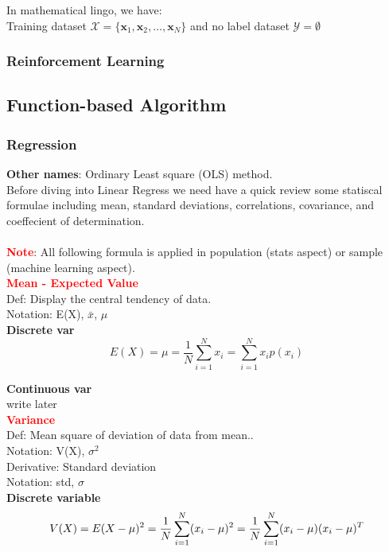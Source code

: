 \documentclass[12pt,a4paper]{article}
\newcounter{subsubsubsection}[subsubsection]
\newcommand{\red}[1]{\textcolor{red}{\textbf{#1}}}
\newcommand{\subscript}[1]{_{{#1}}}
\begin{document}
\noindent In mathematical lingo, we have:\\
Training dataset $\mathcal{X} = \{\mathbf{x}_1, \mathbf{x}_2, \dots, \mathbf{x}_N\}$ and no label dataset $\mathcal{Y} = \emptyset$

\subsubsection{Reinforcement Learning} %

\subsection{Function-based Algorithm}
\subsubsection{Regression}
\noindent \textbf{Other names}: Ordinary Least square (OLS) method.\\
Before diving into Linear Regress we need have a quick review some statiscal formulae including mean, standard deviations, correlations, covariance, and coeffecient of determination.\\\\
\red{Note}: All following formula is applied in population (stats aspect) or sample (machine learning aspect).\\

\noindent\textbf{\red{Mean -  Expected Value}}\\
Def: Display the central tendency of data.\\
Notation: E(X), $\bar{x}$, $\mu$\\
\textbf{Discrete var}
\begin{displaymath}
E(X) = \mu =
\frac{1}{N}\sum_{i=1}^{N} x\subscript{i} =
\sum_{i=1}^{N} x\subscript{i}p(x\subscript{i})
\end{displaymath}

\noindent \textbf{Continuous var}\\
write later\\

\noindent\textbf{\red{Variance}}\\
Def: Mean square of deviation of data from mean..\\
Notation: V(X), $\sigma^2$\\
Derivative: Standard deviation\\
Notation: std, $\sigma$\\
\textbf{Discrete variable}
\begin{equation}
V(X) = E(X-\mu)^2 =
\frac{1}{N}\sum_{i=1}^{N}(x\subscript{i}-\mu)^2 =
\frac{1}{N}\sum_{i=1}^{N}(x\subscript{i}-\mu)(x\subscript{i}-\mu)^T\\
\end{equation}
\end{document}
